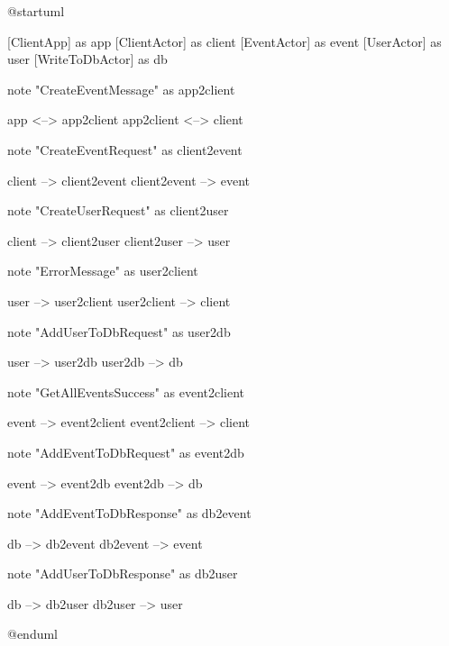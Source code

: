 \begin{plantuml}
@startuml

[ClientApp] as app
[ClientActor] as client
[EventActor] as event
[UserActor] as user
[WriteToDbActor] as db

note "CreateEventMessage\nGetAllEventsMessage\nGetEventByIdMessage\nGetPurchasedTicketsMessage\nGetRemainingBudgetForCurrentYearMessage\nGetSoldTicketsMessage\nInitStateMessage\nPersistStateMessage\nPurchaseTicketsMessage\nRestoreStateMessage" as app2client

app <--> app2client
app2client <--> client

note "CreateEventRequest\nGetAllEventsRequest\nGetEventByIdRequest\nGetSoldTicketsRequest\nPurchaseTicketsRequest" as client2event

client --> client2event
client2event --> event

note "CreateUserRequest\nGetPurchasedTicketsRequest\nGetRemainingBudgetForCurrentYearRequest" as client2user

client --> client2user
client2user --> user
    
note "ErrorMessage\nCreateUserSuccess\nGetPurchasedTicketsSuccess\nGetRemainingBudgetForCurrentYearSuccess" as user2client

user --> user2client
user2client --> client

note "AddUserToDbRequest" as user2db

user --> user2db
user2db -->  db

note "GetAllEventsSuccess\nErrorMessage\nGetEventByIdSuccess\nGetSoldTicketsSuccess\nPurchaseTicketsSuccess\nCreateEventSuccess" as event2client

event --> event2client
event2client --> client

note "AddEventToDbRequest\nAddTicketsToDbRequest" as event2db

event --> event2db
event2db --> db

note "AddEventToDbResponse\nAddTicketsToDbResponse" as db2event

db --> db2event
db2event --> event

note "AddUserToDbResponse" as db2user

db --> db2user
db2user --> user

@enduml
\end{plantuml}
